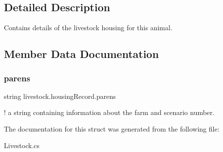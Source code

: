 \subsection{Detailed Description}
Contains details of the livestock housing for this animal. 

\subsection{Member Data Documentation}
\mbox{\label{structlivestock_1_1housing_record_a180d9ab0c1e6023d24500933a2f546f7}} 
\subsubsection{\texorpdfstring{parens}{parens}}
{\footnotesize\ttfamily string livestock.\+housing\+Record.\+parens}

! a string containing information about the farm and scenario number. 

The documentation for this struct was generated from the following file\+:\begin{DoxyCompactItemize}
\item 
Livestock.\+cs\end{DoxyCompactItemize}
